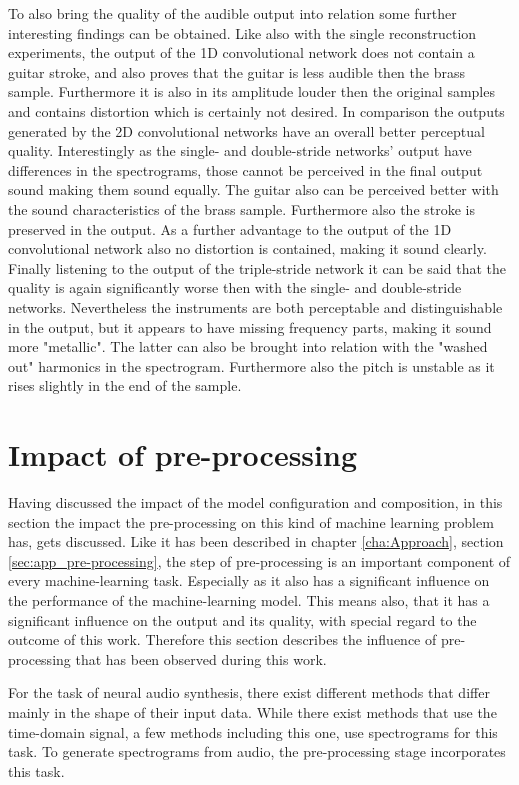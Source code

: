 To also bring the quality of the audible output into relation some further interesting findings can be obtained. Like also with the single reconstruction experiments, the output of the 1D convolutional network does not contain a guitar stroke, and also proves that the guitar is less audible then the brass sample. Furthermore it is also in its amplitude louder then the original samples and contains distortion which is certainly not desired. In comparison the outputs generated by the 2D convolutional networks have an overall better perceptual quality. Interestingly as the single- and double-stride networks' output have differences in the spectrograms, those cannot be perceived in the final output sound making them sound equally. The guitar also can be perceived better with the sound characteristics of the brass sample. Furthermore also the stroke is preserved in the output. As a further advantage to the output of the 1D convolutional network also no distortion is contained, making it sound clearly. Finally listening to the output of the triple-stride network it can be said that the quality is again significantly worse then with the single- and double-stride networks. Nevertheless the instruments are both perceptable and distinguishable in the output, but it appears to have missing frequency parts, making it sound more "metallic". The latter can also be brought into relation with the "washed out" harmonics in the spectrogram. Furthermore also the pitch is unstable as it rises slightly in the end of the sample. 


\section{Impact of pre-processing}
\label{sec:disc_imp_pre_processing}
Having discussed the impact of the model configuration and composition, in this section the impact the pre-processing on this kind of machine learning problem has, gets discussed. Like it has been described in chapter \ref{cha:Approach}, section \ref{sec:app_pre-processing}, the step of pre-processing is an important component of every machine-learning task. Especially as it also has a significant influence on the performance of the machine-learning model. This means also, that it has a significant influence on the output and its quality, with special regard to the outcome of this work. Therefore this section describes the influence of pre-processing that has been observed during this work. 

For the task of neural audio synthesis, there exist different methods that differ mainly in the shape of their input data. While there exist methods that use the time-domain signal, a few methods including this one, use spectrograms for this task. To generate spectrograms from audio, the pre-processing stage incorporates this task. 

